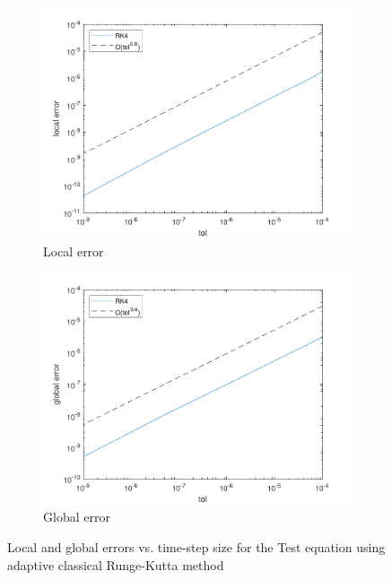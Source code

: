 \begin{figure}[H]
\centering
    \begin{subfigure}{0.49\linewidth}
        \includegraphics[width=\linewidth]{images/6/6_3_localerror.pdf}
        \caption{Local error}
    \end{subfigure}
    \begin{subfigure}{0.49\linewidth}
        \includegraphics[width=\linewidth]{images/6/6_3_globalerror.pdf}
        \caption{Global error}
    \end{subfigure}
    \caption{Local and global errors vs. time-step size for the Test equation using adaptive classical Runge-Kutta method}
    \label{6_3_TE_errors}
\end{figure}

